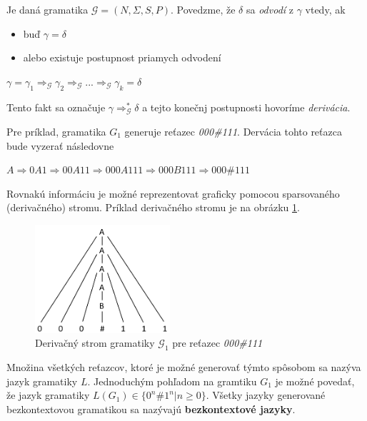 \begin{definice}
Je daná gramatika $\mathcal{G} = (N, \Sigma , S, P)$. Povedzme, že $\delta$ sa \textit{odvodí} z $\gamma$ vtedy, ak
\begin{itemize}
\item buď $\gamma = \delta$
\item alebo existuje postupnost priamych odvodení
\end{itemize}
\begin{center}
$\gamma = \gamma_1 \Rightarrow_\mathcal{G} \gamma_2 \Rightarrow_\mathcal{G} ... \Rightarrow_\mathcal{G} \gamma_k = \delta$
\end{center}
Tento fakt sa označuje $\gamma\Rightarrow_\mathcal{G}^*\delta$ a tejto konečnj postupnosti hovoríme \textit{derivácia}. \cite{demlova:gramatiky}
\end{definice}

Pre príklad, gramatika $G_1$ generuje  reťazec \textit{000\#111}. Dervácia tohto reťazca bude vyzerať následovne
\begin{center}
$A \Rightarrow 0A1 \Rightarrow 00A11 \Rightarrow 000A111 \Rightarrow 000B111 \Rightarrow 000\#111$
\end{center}

Rovnakú informáciu je možné reprezentovat graficky pomocou sparsovaného (derivačného) stromu. Príklad derivačného stromu je na obrázku \ref{fig:derivacni_strom}. 

\begin{figure}[H]
\begin{center}
\includegraphics[width=5cm]{figures/derivacni_strom.PNG}
\caption{Derivačný strom gramatiky $\mathcal{G}_1$ pre reťazec \textit{000\#111}}
\label{fig:derivacni_strom}
\end{center}
\end{figure}

Množina všetkých reťazcov, ktoré je možné generovať týmto spôsobom sa nazýva jazyk gramatiky $L$. Jednoduchým pohľadom na gramtiku $G_1$ je možné povedať, že jazyk gramatiky $L(G_1) \in \{0^n\#1^n | n \geq 0\}$. Všetky jazyky generované bezkontextovou gramatikou sa nazývajú \textbf{bezkontextové jazyky}.

